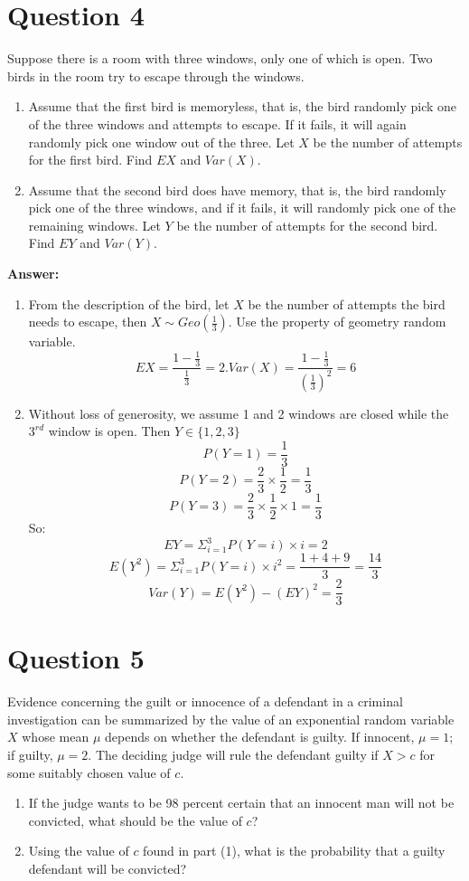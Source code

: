 \documentclass[hidelinks]{article}
\begin{document}
\section{Question 4}
Suppose there is a room with three windows, only one of which is open. Two birds in the room try to escape through the windows.
\begin{enumerate}
    \item Assume that the first bird is memoryless, that is, the bird randomly pick one of the three windows and attempts to escape. If it fails, it will again randomly pick one window out of the three. Let $X$ be the number of attempts for the first bird. Find $EX$ and $Var(X)$.
    \item Assume that the second bird does have memory, that is, the bird randomly pick one of the three windows, and if it fails, it will randomly pick one of the remaining windows. Let $Y$ be the number of attempts for the second bird. Find $EY$ and $Var(Y)$.
\end{enumerate}
\textbf{Answer:}
\begin{enumerate}
    \item From the description of the bird, let $X$ be the number of attempts the bird needs to escape, then $X \sim Geo(\frac{1}{3})$. Use the property of geometry random variable.
    $$EX = \frac{1 - \frac{1}{3}}{\frac{1}{3}} = 2. Var(X) = \frac{1 - \frac{1}{3}}{(\frac{1}{3})^2} = 6$$
    \item Without loss of generosity, we assume 1 and 2 windows are closed while the $3^{rd}$ window is open. Then $Y \in \{1,2,3\}$
    $$P(Y = 1) = \frac{1}{3}$$
    $$P(Y = 2) = \frac{2}{3} \times \frac{1}{2} = \frac{1}{3}$$
    $$P(Y = 3) = \frac{2}{3} \times \frac{1}{2} \times 1 = \frac{1}{3}$$
    So:
    $$ EY = \Sigma^3_{i=1}P(Y=i)\times i = 2$$
    $$ E(Y^2) = \Sigma^3_{i=1}P(Y=i)\times i^2 = \frac{1 + 4 + 9}{3} =\frac{14}{3}$$
    $$ Var(Y) = E(Y^2) - (EY)^2 = \frac{2}{3}$$
\end{enumerate}



\section{Question 5}
Evidence concerning the guilt or innocence of a defendant in a criminal investigation can be summarized by the value of an exponential random variable $X$ whose mean $\mu$ depends on whether the defendant is guilty. If innocent, $\mu = 1$; if guilty, $\mu = 2$. The deciding judge will rule the defendant guilty if $X>c$ for some suitably chosen value of $c$.
\begin{enumerate}
    \item  If the judge wants to be 98 percent certain that an innocent man will not be convicted, what should be the value of $c$?
    \item  Using the value of $c$ found in part (1), what is the probability that a guilty defendant will be convicted?
\end{enumerate}
\end{document}
